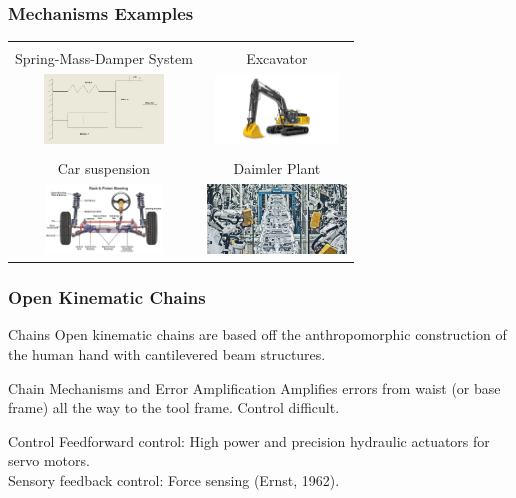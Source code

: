 \begin{frame}
	\frametitle{Mechanisms Examples}
	\begin{tabular}{|c|c|} 
	\hline  \\
	Spring-Mass-Damper System & Excavator \\
	\includegraphics[height=5em,width=10em]{figures/spring-mass-damper.jpg} & 
	\includegraphics[height=5em,width=10em]{figures/excavJohnDeere.jpg} \\
	\hline \\
	Car suspension & Daimler  Plant \\
	\includegraphics[height=5em,width=10em]{figures/carsusp.jpg} &
	\includegraphics[height=5em,width=10em]{figures/daimler_manuf.jpeg} \\
	\hline
	\end{tabular}
\end{frame}


\begin{frame}
	\frametitle{Open Kinematic Chains}
	\begin{block}{Chains}
		Open kinematic chains are based off the anthropomorphic construction of the human hand with cantilevered beam structures.
	\end{block}
	\begin{block}{Chain Mechanisms and Error Amplification}
		Amplifies errors from waist (or base frame) all the way to the tool frame. Control difficult. 
	\end{block}
	\begin{block}{Control}
		Feedforward control: High power and precision hydraulic actuators for servo motors. \\
		Sensory feedback control: Force sensing (Ernst, 1962). 
	\end{block}
\end{frame}


